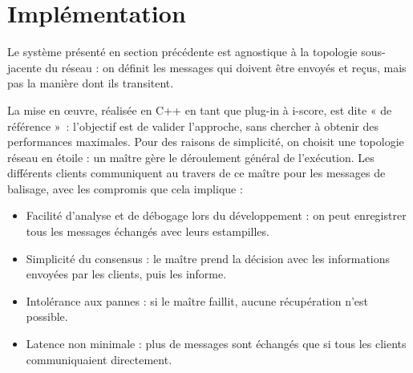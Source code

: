 \documentclass[10pt]{article}
\begin{document}
\begin{figure}[h]
	\centering
		\begin{tikzpicture}
		
		\end{tikzpicture}
        \label{scenar.depl-interactif-sync}
\end{figure}




\section{Implémentation}\label{sec.implementation}

Le système présenté en section précédente est agnostique à la topologie sous-jacente du réseau : on définit les messages qui doivent être envoyés et reçus, mais pas la manière dont ils transitent.

La mise en œuvre, réalisée en C++ en tant que plug-in à i-score, est dite « de référence »~: l'objectif est de valider l'approche, sans chercher à obtenir des performances maximales.
Pour des raisons de simplicité, on choisit une topologie réseau en étoile : un maître gère le déroulement général de l'exécution. 
Les différents clients communiquent au travers de ce maître pour les messages de balisage, avec les compromis que cela implique : 
\begin{itemize}
    \item Facilité d'analyse et de débogage lors du développement : on peut enregistrer tous les messages échangés avec leurs estampilles.
    \item Simplicité du consensus : le maître prend la décision avec les informations envoyées par les clients, puis les informe.
    \item Intolérance aux pannes : si le maître faillit, aucune récupération n'est possible.
    \item Latence non minimale : plus de messages sont échangés que si tous les clients communiquaient directement.
\end{itemize}
\end{document}

